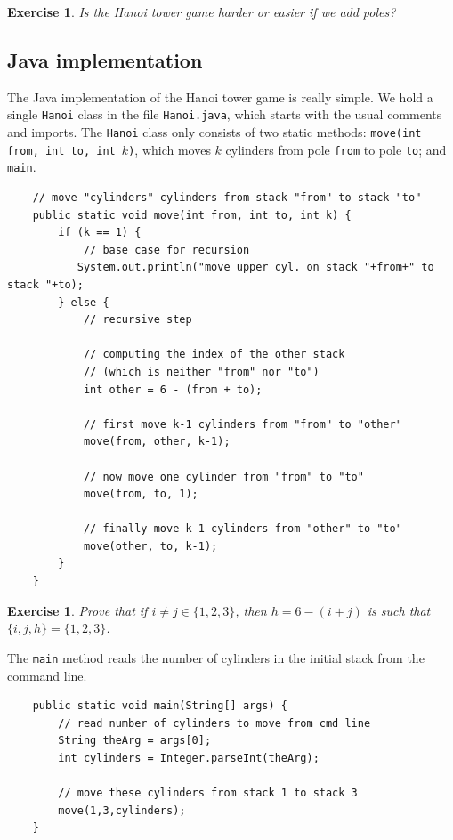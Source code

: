 \documentclass[a4paper]{book}
\theoremstyle{changebreak}                %
\newtheorem{ex}[result]{Exercise}
\begin{document}
\begin{ex}
Is the Hanoi tower game harder or easier if we add poles?
\end{ex}

\subsection{Java implementation}
The Java implementation of the Hanoi tower
game is really simple. We hold a single {\tt Hanoi} class in the file
{\tt Hanoi.java}, which starts with the usual comments
and imports. The {\tt Hanoi} class only consists of two
static methods: {\tt move(int from, int to, int $k$)}, which moves $k$
cylinders from pole {\tt from} to pole {\tt to}; and {\tt main}.

\begin{verbatim}
    // move "cylinders" cylinders from stack "from" to stack "to"
    public static void move(int from, int to, int k) {
        if (k == 1) {
            // base case for recursion
           System.out.println("move upper cyl. on stack "+from+" to stack "+to);
        } else {
            // recursive step
            
            // computing the index of the other stack 
            // (which is neither "from" nor "to")
            int other = 6 - (from + to);
            
            // first move k-1 cylinders from "from" to "other"
            move(from, other, k-1);

            // now move one cylinder from "from" to "to"
            move(from, to, 1);

            // finally move k-1 cylinders from "other" to "to"
            move(other, to, k-1);
        }
    }
\end{verbatim}

\begin{ex}
Prove that if $i\not=j\in\{1,2,3\}$, then $h=6-(i+j)$ is such that 
$\{i,j,h\}=\{1,2,3\}$.
\end{ex}

The {\tt main} method reads the number of cylinders in the initial
stack from the command line.
\begin{verbatim}
    public static void main(String[] args) {
        // read number of cylinders to move from cmd line
        String theArg = args[0];
        int cylinders = Integer.parseInt(theArg);

        // move these cylinders from stack 1 to stack 3
        move(1,3,cylinders);
    }
\end{verbatim}
\end{document}
